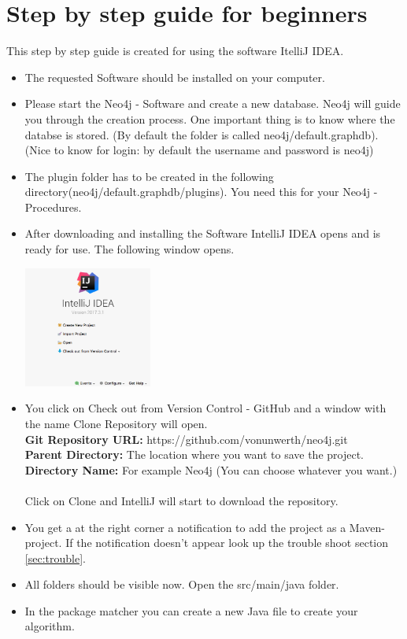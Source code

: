 \section{Step by step guide for beginners}\label{sec:stepByStepManual}
This step by step guide is created for using the software \glqq ItelliJ IDEA\grqq{}.
\begin{itemize}
	\item The requested Software should be installed on your computer.
	\item Please start the Neo4j - Software and create a new database. Neo4j will guide you through the creation process. One important thing is to know where the databse is stored. (By default the folder is called neo4j/default.graphdb). \\(Nice to know for login: by default the username and password is neo4j)
	\item The plugin folder has to be created in the following directory(neo4j/default.graphdb/plugins). You need this for your \glqq  Neo4j - Procedures\grqq{}.
	\newpage
	\item After downloading and installing the Software \glqq IntelliJ IDEA\grqq{} opens and is ready for use. The following window opens. \\
	\begin{center}
		\includegraphics[width=4.2cm]{common/IntelliJstart.png}\setlength{\unitlength}{1mm}
	\end{center}

	\item You click on \glqq Check out from Version Control - GitHub\grqq{} and a window with the name \glqq Clone Repository\grqq{} will open. \\
	\textbf{Git Repository URL:} https://github.com/vonunwerth/neo4j.git \\
	\textbf{Parent Directory:} The location where you want to save the project.  \\
	\textbf{Directory Name:} For example Neo4j (You can choose whatever you want.)\\
	\\
	Click on Clone and IntelliJ will start to download the repository.
	
	\item You get a at the right corner a notification to add the project as a Maven-project. If the notification doesn't appear look up the trouble shoot section \ref{sec:trouble}.
	
	\item All folders should be visible now. Open the src/main/java folder.
	\item In the \glqq package matcher\grqq{} you can create a new Java file to create your algorithm.
\end{itemize}

